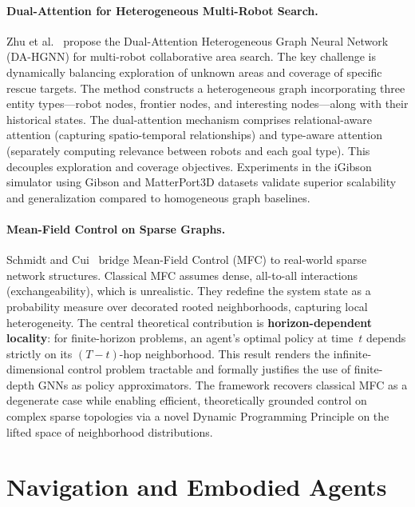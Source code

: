 \documentclass{article}
\begin{document}
\paragraph{Dual-Attention for Heterogeneous Multi-Robot Search.}
Zhu et al.~\cite{dualattn2026} propose the Dual-Attention Heterogeneous Graph Neural Network (DA-HGNN) for multi-robot collaborative area search. The key challenge is dynamically balancing exploration of unknown areas and coverage of specific rescue targets. The method constructs a heterogeneous graph incorporating three entity types---robot nodes, frontier nodes, and interesting nodes---along with their historical states. The dual-attention mechanism comprises relational-aware attention (capturing spatio-temporal relationships) and type-aware attention (separately computing relevance between robots and each goal type). This decouples exploration and coverage objectives. Experiments in the iGibson simulator using Gibson and MatterPort3D datasets validate superior scalability and generalization compared to homogeneous graph baselines.

\paragraph{Mean-Field Control on Sparse Graphs.}
Schmidt and Cui~\cite{mfc2026} bridge Mean-Field Control (MFC) to real-world sparse network structures. Classical MFC assumes dense, all-to-all interactions (exchangeability), which is unrealistic. They redefine the system state as a probability measure over decorated rooted neighborhoods, capturing local heterogeneity. The central theoretical contribution is \textbf{horizon-dependent locality}: for finite-horizon problems, an agent's optimal policy at time~$t$ depends strictly on its $(T{-}t)$-hop neighborhood. This result renders the infinite-dimensional control problem tractable and formally justifies the use of finite-depth GNNs as policy approximators. The framework recovers classical MFC as a degenerate case while enabling efficient, theoretically grounded control on complex sparse topologies via a novel Dynamic Programming Principle on the lifted space of neighborhood distributions.

\section{Navigation and Embodied Agents}
\label{sec:nav}
\end{document}

